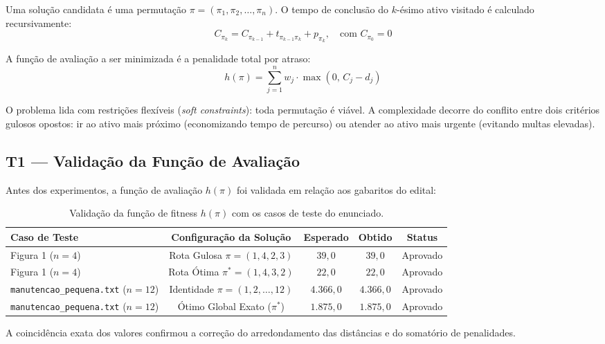 \documentclass[11pt,a4paper]{article}
\begin{document}
Uma solução candidata é uma permutação $\pi = (\pi_1, \pi_2, \dots, \pi_n)$. O tempo de conclusão do $k$-ésimo ativo visitado é calculado recursivamente:
\begin{equation}
C_{\pi_k} = C_{\pi_{k-1}} + t_{\pi_{k-1}\pi_k} + p_{\pi_k}, \quad \text{com } C_{\pi_0} = 0
\end{equation}

A função de avaliação a ser minimizada é a penalidade total por atraso:
\begin{equation}
h(\pi) = \sum_{j=1}^n w_j \cdot \max(0, \, C_j - d_j)
\end{equation}

O problema lida com restrições flexíveis (\textit{soft constraints}): toda permutação é viável. A complexidade decorre do conflito entre dois critérios gulosos opostos: ir ao ativo mais próximo (economizando tempo de percurso) ou atender ao ativo mais urgente (evitando multas elevadas).

\subsection{T1 --- Validação da Função de Avaliação}
Antes dos experimentos, a função de avaliação $h(\pi)$ foi validada em relação aos gabaritos do edital:

\begin{table}[htbp]
\centering
\small
\caption{Validação da função de fitness $h(\pi)$ com os casos de teste do enunciado.}
\label{tab:t1}
\begin{tabular}{lcccc}
\toprule
\textbf{Caso de Teste} & \textbf{Configuração da Solução} & \textbf{Esperado} & \textbf{Obtido} & \textbf{Status} \\
\midrule
Figura 1 ($n=4$) & Rota Gulosa $\pi = (1, 4, 2, 3)$ & $39,0$ & $39,0$ & Aprovado \\
Figura 1 ($n=4$) & Rota Ótima $\pi^* = (1, 4, 3, 2)$ & $22,0$ & $22,0$ & Aprovado \\
\texttt{manutencao\_pequena.txt} ($n=12$) & Identidade $\pi = (1, 2, \dots, 12)$ & $4.366,0$ & $4.366,0$ & Aprovado \\
\texttt{manutencao\_pequena.txt} ($n=12$) & Ótimo Global Exato ($\pi^*$) & $1.875,0$ & $1.875,0$ & Aprovado \\
\bottomrule
\end{tabular}
\end{table}

A coincidência exata dos valores confirmou a correção do arredondamento das distâncias e do somatório de penalidades.
\end{document}
